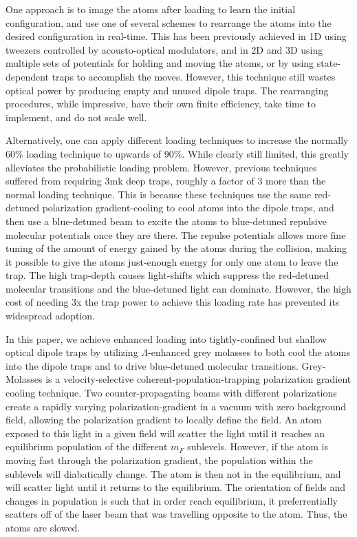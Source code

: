 \documentclass[aps,prl,amsmath,amssymb,groupedaddress,10pt,superscriptaddress,floatfix,twocolumn,showkeys,longbibliography]{revtex4-1} %
\begin{document}
One approach is to image the atoms after loading to learn the initial configuration, and use one of several schemes to rearrange the atoms into the desired configuration in real-time. This has been previously achieved in 1D using tweezers controlled by acousto-optical modulators, and in 2D and 3D using multiple sets of potentials for holding and moving the atoms, or by using state-dependent traps to accomplish the moves. However, this technique still wastes optical power by producing empty and unused dipole traps. The rearranging procedures, while impressive, have their own finite efficiency, take time to implement, and do not scale well. 

Alternatively, one can apply different loading techniques to increase the normally 60\% loading technique to upwards of 90\%. While clearly still limited, this greatly alleviates the probabilistic loading problem. However, previous techniques suffered from requiring 3mk deep traps, roughly a factor of 3 more than the normal loading technique. This is because these techniques use the same red-detuned polarization gradient-cooling to cool atoms into the dipole traps, and then use a blue-detuned beam to excite the atoms to blue-detuned repulsive molecular potentials once they are there. The repulse potentials allows more fine tuning of the amount of energy gained by the atoms during the collision, making it possible to give the atoms just-enough energy for only one atom to leave the trap. The high trap-depth causes light-shifts which suppress the red-detuned molecular transitions and the blue-detuned light can dominate. However, the high cost of needing 3x the trap power to achieve this loading rate has prevented its widespread adoption.

In this paper, we achieve enhanced loading into tightly-confined but shallow optical dipole traps by utilizing $\Lambda$-enhanced grey molasses to both cool the atoms into the dipole traps and to drive blue-detuned molecular transitions. Grey-Molasses is a velocity-selective coherent-population-trapping polarization gradient cooling technique. Two counter-propagating beams with different polarizations create a rapidly varying polarization-gradient in a vacuum with zero background field, allowing the polarization gradient to locally define the field. An atom exposed to this light in a given field will scatter the light until it reaches an equilibrium population of the different $m_F$ sublevels. However, if the atom is moving fast through the polarization gradient, the population within the sublevels will diabatically change. The atom is then not in the equilibrium, and will scatter light until it returns to the equilibrium. The orientation of fields and changes in population is such that in order reach equilibrium, it preferrentially scatters off of the laser beam that was travelling opposite to the atom. Thus, the atoms are slowed.  
\end{document}
